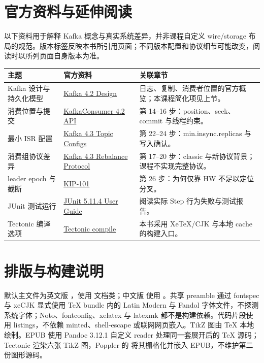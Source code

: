 \section{官方资料与延伸阅读}
以下资料用于解释 Kafka 概念与真实系统差异，并非课程自定义 wire/storage 布局的规范。版本标签反映本书所引用页面；不同版本配置和协议细节可能改变，阅读时以所列页面自身版本为准。
\begin{longtable}{p{}p{}p{}}
\toprule
主题 & 官方资料 & 关联章节 \\
\midrule
\endhead
Kafka 设计与持久化模型 & \href{https://kafka.apache.org/42/design/design/}{Kafka 4.2 Design} & 日志、复制、消费者位置的官方概览；本课程简化项见上节。\\
消费位置与提交 & \href{https://kafka.apache.org/42/javadoc/org/apache/kafka/clients/consumer/KafkaConsumer.html}{KafkaConsumer 4.2 API} & 第 14–16 步：position、seek、commit 与线程约束。\\
最小 ISR 配置 & \href{https://kafka.apache.org/43/configuration/topic-configs/}{Kafka 4.3 Topic Configs} & 第 22–24 步：min.insync.replicas 与写入确认。\\
消费组协议差异 & \href{https://kafka.apache.org/43/operations/consumer-rebalance-protocol/}{Kafka 4.3 Rebalance Protocol} & 第 17–20 步：classic 与新协议背景；课程不实现完整协议。\\
leader epoch 与截断 & \href{https://cwiki.apache.org/confluence/display/KAFKA/KIP-101+-+Alter+Replication+Protocol+to+use+Leader+Epoch+rather+than+High+Watermark+for+Truncation}{KIP-101} & 第 26 步：为何仅靠 HW 不足以定位分叉。\\
JUnit 测试运行 & \href{https://docs.junit.org/5.11.4/user-guide/}{JUnit 5.11.4 User Guide} & 阅读实际 Step 行为失败与测试报告。\\
Tectonic 编译选项 & \href{https://tectonic-typesetting.github.io/book/latest/v2cli/compile.html}{Tectonic compile} & 本书采用 XeTeX/CJK 与本地 cache 的构建入口。\\
\bottomrule
\end{longtable}

\section{排版与构建说明}
默认主文件为英文版 ，使用  文档类；中文版  使用 。共享 preamble 通过 fontspec 与 xeCJK 显式使用 TeX bundle 内的 Latin Modern 与 Fandol 字体文件，不探测系统字体；Noto、fontconfig、xelatex 与 latexmk 都不是构建依赖。代码片段使用 listings，不依赖 minted、shell-escape 或联网网页嵌入。TikZ 图由 TeX 本地绘制。EPUB 使用 Pandoc 3.12.1 自定义 reader 处理同一套展开后的 TeX 源码；Tectonic 渲染六张 TikZ 图，Poppler 的  将其栅格化并嵌入 EPUB，不维护第二份图形源码。

